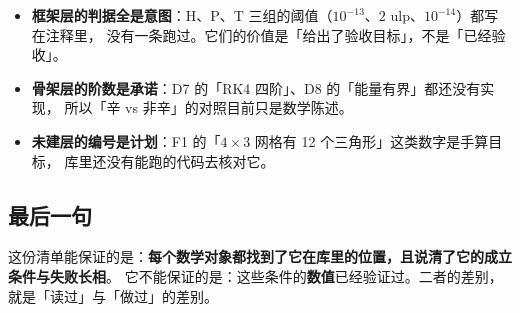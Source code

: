 \begin{itemize}[leftmargin=1.4em]
  \item \textbf{框架层的判据全是意图}：H、P、T 三组的阈值（$10^{-13}$、$2$ ulp、$10^{-14}$）都写在注释里，
        没有一条跑过。它们的价值是「给出了验收目标」，不是「已经验收」。
  \item \textbf{骨架层的阶数是承诺}：D7 的「RK4 四阶」、D8 的「能量有界」都还没有实现，
        所以「辛 vs 非辛」的对照目前只是数学陈述。
  \item \textbf{未建层的编号是计划}：F1 的「$4\times3$ 网格有 12 个三角形」这类数字是手算目标，
        库里还没有能跑的代码去核对它。
\end{itemize}

\subsection{最后一句}

这份清单能保证的是：\textbf{每个数学对象都找到了它在库里的位置，且说清了它的成立条件与失败长相}。
它不能保证的是：这些条件的\textbf{数值}已经验证过。二者的差别，就是「读过」与「做过」的差别。
